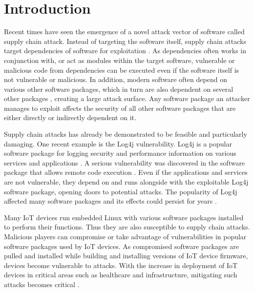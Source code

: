 \section{Introduction}
Recent times have seen the emergence of a novel attack vector of software called supply chain attack. Instead of targeting the software itself, supply chain attacks target dependencies of software for exploitation \cite{Review_of_Open_Source, Evaluating_and_Mitigating}. As dependencies often works in conjunction with, or act as modules within the target software, vulnerable or malicious code from dependencies can be executed even if the software itself is not vulnerable or malicious. In addition, modern software often depend on various other software packages, which in turn are also dependent on several other packages \cite{Evaluating_and_mitigating}, creating a large attack surface. Any software package an attacker manages to exploit affects the security of all other software packages that are either directly or indirectly dependent on it.\par
Supply chain attacks has already be demonstrated to be feasible and particularly damaging. One recent example is the Log4j vulnerability. Log4j is a popular software package for logging security and performance information on various services and applications \cite{CISA}. A serious vulnerability was discovered in the software package that allows remote code execution \cite{CISA}. Even if the applications and services are not vulnerable, they depend on and runs alongside with the exploitable Log4j software package, opening doors to potential attacks. The popularity of Log4j affected many software packages \cite{CISA_Log4j_List} and its effects could persist for years \cite{Review_of_log4j}.\par
Many IoT devices run embedded Linux with various software packages installed to perform their functions. Thus they are also susceptible to supply chain attacks. Malicious players can compromise or take advantage of vulnerabilities in popular software packages used by IoT devices. As compromised software packages are pulled and installed while building and installing versions of IoT device firmware, devices become vulnerable to attacks. With the increase in deployment of IoT devices in critical areas such as healthcare and infrastructure, mitigating such attacks becomes critical \cite{IoT_Supply_Chain_Attack_Trends}.\par 
